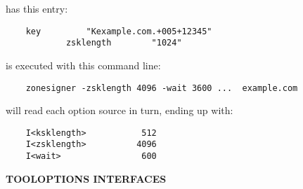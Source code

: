  has this entry:

\begin{verbatim}
    key         "Kexample.com.+005+12345"
            zsklength        "1024"
\end{verbatim}

 is executed with this command line:

\begin{verbatim}
    zonesigner -zsklength 4096 -wait 3600 ...  example.com
\end{verbatim}

will read each option source in turn, ending up with:
\begin{verbatim}
    I<ksklength>           512
    I<zsklength>          4096
    I<wait>                600
\end{verbatim}

{\bf TOOLOPTIONS INTERFACES}

